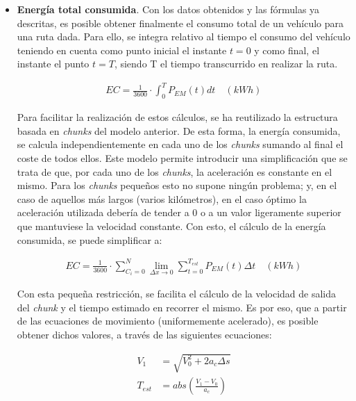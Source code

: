 \documentclass[11pt,spanish,listoffigures,listoftables]{tfgetsinf}
\begin{document}
\begin{itemize}
    \item \textbf{Energía total consumida}. Con los datos obtenidos y las fórmulas ya descritas, es posible obtener finalmente el consumo total de un vehículo para una ruta dada. Para ello, se integra relativo al tiempo el consumo del vehículo teniendo en cuenta como punto inicial el instante $t=0$ y como final, el instante el punto $t=T$, siendo T el tiempo transcurrido en realizar la ruta.
    
    \begin{align*}
        EC = \frac{1}{3600} \cdot \int_{0}^{T}{P_{EM}(t)dt} \quad(kWh)
    \end{align*}
    
    Para facilitar la realización de estos cálculos, se ha reutilizado la estructura basada en \textit{chunks} del modelo anterior. De esta forma, la energía consumida, se calcula independientemente en cada uno de los \textit{chunks} sumando al final el coste de todos ellos. Este modelo permite introducir una simplificación que se trata de que, por cada uno de los \textit{chunks}, la aceleración es constante en el mismo. Para los \textit{chunks} pequeños esto no supone ningún problema; y, en el caso de aquellos más largos (varios kilómetros), en el caso óptimo la aceleración utilizada debería de tender a 0 o a un valor ligeramente superior que mantuviese la velocidad constante. Con esto, el cálculo de la energía consumida, se puede simplificar a:
    
    \begin{align*}
        EC = \frac{1}{3600} \cdot \sum_{C_i=0}^{N} \lim_{\Delta x\to0} \sum_{t=0}^{T_{est}}{P_{EM}(t)\Delta t} \quad(kWh)
    \end{align*}
    
    Con esta pequeña restricción, se facilita el cálculo de la velocidad de salida del \textit{chunk} y el tiempo estimado en recorrer el mismo. Es por eso, que a partir de las ecuaciones de movimiento (uniformemente acelerado), es posible obtener dichos valores, a través de las siguientes ecuaciones:
    
    \begin{align*}
        V_{1} &= \sqrt{V_{0}^{2} + 2 a_{c} \Delta s} \\
        T_{est} &= abs \left( \frac{V_{1} - V_{0}}{a_{c}} \right)
    \end{align*}
\end{itemize}
\end{document}
